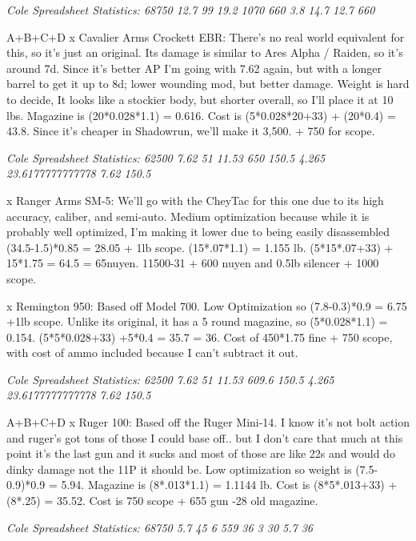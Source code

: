 \begin{multicols*}{2}
	\textit{\textcolor{OliveGreen}{Cole Spreadsheet Statistics: 68750 12.7 99 19.2 1070 660 3.8 14.7 12.7 660}}
	
	A+B+C+D
	x Cavalier Arms Crockett EBR: There's no real world equivalent for this, so it's just an original. Its damage is similar to Ares Alpha / Raiden, so it's around 7d. Since it's better AP I'm going with 7.62 again, but with a longer barrel to get it up to 8d; lower wounding mod, but better damage. Weight is hard to decide,  It looks like a stockier body, but shorter overall, so I'll place it at 10 lbs. Magazine is (20*0.028*1.1) = 0.616. Cost is (5*0.028*20+33) + (20*0.4) = 43.8. Since it's cheaper in Shadowrun, we'll make it 3,500. + 750 for scope.
	
	\textit{\textcolor{OliveGreen}{Cole Spreadsheet Statistics: 62500 7.62 51 11.53 650 150.5 4.265 23.6177777777778 7.62 150.5}}
	
	x Ranger Arms SM-5: We'll go with the CheyTac for this one due to its high accuracy, caliber, and semi-auto. Medium optimization because while it is probably well optimized, I'm making it lower due to being easily disassembled (34.5-1.5)*0.85 = 28.05 + 1lb scope. (15*.07*1.1)  = 1.155 lb. (5*15*.07+33) + 15*1.75 = 64.5 = 65nuyen. 11500-31 + 600 nuyen and 0.5lb silencer +  1000 scope.
	
	x Remington 950: Based off Model 700.  Low Optimization so (7.8-0.3)*0.9 = 6.75 +1lb scope.   Unlike its original, it has a 5 round magazine, so (5*0.028*1.1) = 0.154. (5*5*0.028+33) +5*0.4 = 35.7 = 36. Cost of 450*1.75 fine + 750 scope, with cost of ammo included because I can't subtract it out. 
	
	\textit{\textcolor{OliveGreen}{Cole Spreadsheet Statistics: 62500 7.62 51 11.53 609.6 150.5 4.265 23.6177777777778 7.62 150.5}}
	
	A+B+C+D
	x Ruger 100: Based off the Ruger Mini-14. I know it's not bolt action and ruger's got tons of those I could base off.. but I don't care that much at this point it's the last gun and it sucks and most of those are like 22s and would do dinky damage not the 11P it should be. Low optimization so weight is (7.5-0.9)*0.9 = 5.94. Magazine is (8*.013*1.1) = 1.1144 lb. Cost is (8*5*.013+33) + (8*.25) = 35.52. Cost is 750 scope + 655 gun -28 old magazine.
	
	\textit{\textcolor{OliveGreen}{Cole Spreadsheet Statistics: 68750 5.7 45 6 559 36 3 30 5.7 36}}
	

\end{multicols*}

